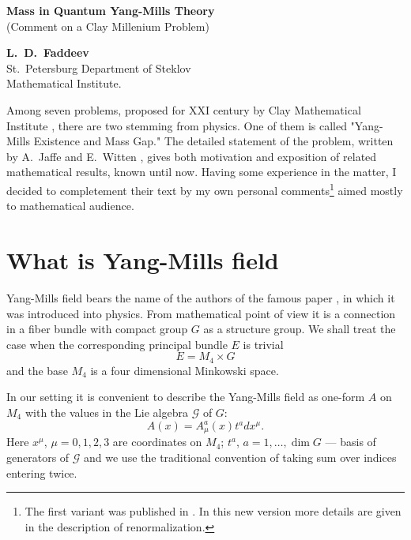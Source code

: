 \documentclass[12pt]{article}
\newcommand{\MM}{M}
\newcommand{\GG}{G}
\newcommand{\EE}{E}
\newcommand{\JJ} {\mathcal{G}}
\begin{document}

\begin{center}
{
\bf \large Mass in Quantum Yang-Mills Theory  \\
}
(Comment on a Clay Millenium Problem)\\

\vskip 0.3cm

{\bf L.~D.~Faddeev } \\
St.~Petersburg Department of Steklov \\
Mathematical Institute.
\end{center}


	Among seven problems, proposed for XXI century by Clay 
	Mathematical Institute
\cite{clay},
	there are two stemming from physics. One of them is 
	called 
	"Yang-Mills Existence and Mass Gap."
	The detailed statement of the problem, written by
	A.~Jaffe and E.~Witten
\cite{JW},
	gives both motivation and exposition of related mathematical
	results, known until now.
	Having some experience in the matter, I decided to 
	completement their text	by my own personal 
comments\footnote{The first variant was published in 
\cite{comment}.
In this new version more details are given in the description
of renormalization.} 
	aimed mostly to mathematical audience.

\section{What is Yang-Mills field}
	Yang-Mills field bears the name of the authors of the
	famous paper
\cite{YM},
	in which it was introduced into physics. From mathematical
	point of view it is a connection in a fiber bundle with
	compact group
    $ \GG $
	as a structure group. We shall treat the case when the 
	corresponding principal bundle
    $ \EE $
	is trivial
\begin{equation*}
	\EE = \MM_{4} \times \GG
\end{equation*}
	and the base
    $ \MM_{4} $
	is a four dimensional Minkowski space.

	In our setting it is convenient to describe the Yang-Mills 
	field as one-form
    $ A $
	on
    $ \MM_{4} $
	with the values in the Lie algebra
    $ \JJ $
	of
    $ \GG $:
\begin{equation*}
        A(x) = A^{a}_{\mu} (x) t^{a} dx^{\mu}.
\end{equation*}
	Here
    $ x^{\mu} $, 
    $ \mu = 0,1,2,3 $ 
	are coordinates on
    $ \MM_{4} $;
    $ t^{a} $,
    $ a = 1, \ldots , \dim G $ ---
	basis of generators of
    $ \JJ $
	and we use the traditional convention of taking sum over
	indices entering twice.
\end{document}
